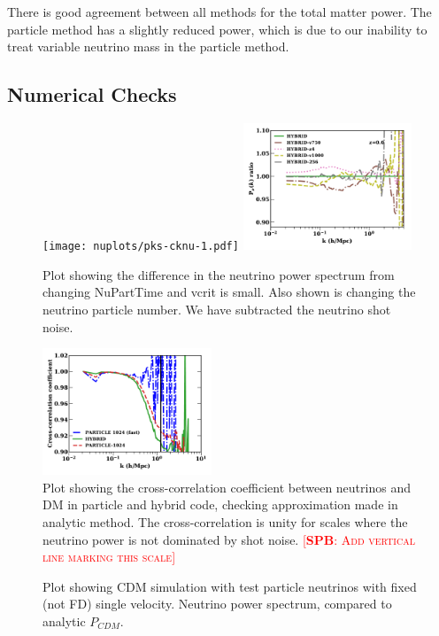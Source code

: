 \documentclass[useAMS, usenatbib]{mnras}
\newcommand{\spb}[1]{{\textsc{\textcolor{red}{[{\bf SPB}: #1]}}}}
\begin{document}
There is good agreement between all methods for the total matter power.
The particle method has a slightly reduced power, which is due to our inability to
treat variable neutrino mass in the particle method.

\subsection{Numerical Checks}

\begin{figure}
  \texttt{[image: nuplots/pks-cknu-1.pdf]}
  \includegraphics[width=0.45\textwidth]{nuplots/pks_nu_ckrel-1.pdf}
  \caption{Plot showing the difference in the neutrino power spectrum from changing NuPartTime and vcrit is small. Also shown is changing the neutrino particle number. We have subtracted the neutrino shot noise.}
  \label{fig:vcrit}
\end{figure}

\begin{figure}
\includegraphics[width=0.45\textwidth]{nuplots/corr_coeff-1.pdf}
  \caption{Plot showing the cross-correlation coefficient between neutrinos
  and DM in particle and hybrid code, checking approximation made in analytic method.
  The cross-correlation is unity for scales where the neutrino power is not dominated by shot noise.
  \spb{Add vertical line marking this scale}
  }
  \label{fig:cross-corr}
\end{figure}


\begin{figure}
    \caption{Plot showing CDM simulation with test particle neutrinos with fixed (not FD) single velocity.
  Neutrino power spectrum, compared to analytic $P_{CDM}$.}
  \label{fig:testpart}
\end{figure}
\end{document}
